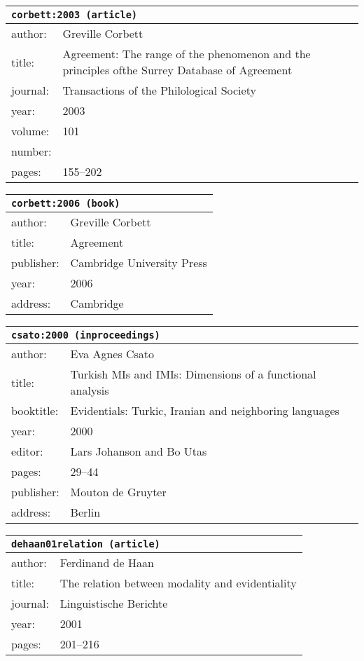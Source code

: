 \documentclass{article}
\begin{document}
\bigskip

\begin{tabular}{p{}p{}}
\multicolumn{2}{l}{\texttt{corbett:2003 (article)}}\\
\hline
author: & Greville Corbett\\
title: & Agreement: The range of the phenomenon and the principles ofthe Surrey Database of Agreement\\
journal: & Transactions of the Philological Society\\
year: & 2003\\
volume: & 101\\
number: & \\
pages: & 155--202\\
\end{tabular}

\bigskip

\begin{tabular}{p{}p{}}
\multicolumn{2}{l}{\texttt{corbett:2006 (book)}}\\
\hline
author: & Greville Corbett\\
title: & Agreement\\
publisher: & Cambridge University Press\\
year: & 2006\\
address: & Cambridge\\
\end{tabular}

\bigskip

\begin{tabular}{p{}p{}}
\multicolumn{2}{l}{\texttt{csato:2000 (inproceedings)}}\\
\hline
author: & Eva Agnes Csato\\
title: & Turkish MIs and IMIs: Dimensions of a functional analysis\\
booktitle: & Evidentials: Turkic, Iranian and neighboring languages\\
year: & 2000\\
editor: & Lars Johanson and Bo Utas\\
pages: & 29--44\\
publisher: & Mouton de Gruyter\\
address: & Berlin\\
\end{tabular}

\bigskip

\begin{tabular}{p{}p{}}
\multicolumn{2}{l}{\texttt{dehaan01relation (article)}}\\
\hline
author: & Ferdinand {de Haan}\\
title: & The relation between modality and evidentiality\\
journal: & Linguistische Berichte\\
year: & 2001\\
pages: & 201--216\\
\end{tabular}
\end{document}
